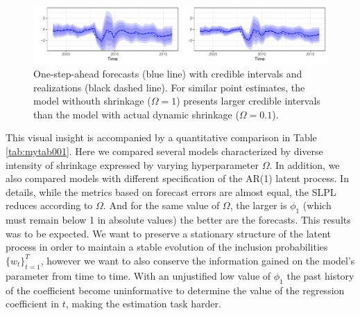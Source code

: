 \documentclass[
  12pt,
]{book}
\theoremstyle{break}
\theoremstyle{nonumberplain}
\begin{document}
\begin{figure}[h]

{\centering \includegraphics{Dynamic-Shrinkage-in-Bayesian-Structural-Time-Series-and-Vector-Autoregressive-Models_files/figure-latex/myfig002-1} 

}

\caption{One-step-ahead forecasts (blue line) with credible intervals and realizations (black dashed line). For similar point estimates, the model withouth shrinkage ($\Omega=1$) presents larger credible intervals than the model with actual dynamic shrinkage ($\Omega=0.1$).}\label{fig:myfig002}
\end{figure}

This visual insight is accompanied by a quantitative comparison in Table
\ref{tab:mytab001}. Here we compared several models characterized by
diverse intensity of shrinkage expressed by varying hyperparameter
\(\Omega\). In addition, we also compared models with different
specification of the AR(1) latent process. In details, while the metrics
based on forecast errors are almost equal, the SLPL reduces according to
\(\Omega\). And for the same value of \(\Omega\), the larger is
\(\phi_1\) (which must remain below 1 in absolute values) the better are
the forecasts. This results was to be expected. We want to preserve a
stationary structure of the latent process in order to maintain a stable
evolution of the inclusion probabilities \(\{w_t\}_{t=1}^{T}\), however
we want to also conserve the information gained on the model's parameter
from time to time. With an unjustified low value of \(\phi_1\) the past
history of the coefficient become uninformative to determine the value
of the regression coefficient in \(t\), making the estimation task
harder.
\end{document}
